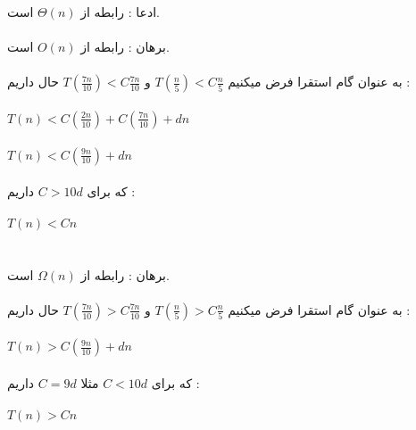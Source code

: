 
\subproblem{}
ادعا : رابطه از $\Theta(n)$ است.\\\\
برهان : رابطه از $O(n)$ است. \\\\
به عنوان گام استقرا فرض میکنیم $T(\frac{n}{5}) < C\frac{n}{5}$ و  $T(\frac{7n}{10}) < C\frac{7n}{10}$ حال داریم : \\\\
$T(n) < C (\frac{2n}{10}) + C (\frac{7n}{10})+ dn$\\\\
$T(n) < C (\frac{9n}{10})+ dn$\\\\
که برای $C>10d$ داریم :\\\\
$T(n) < Cn$\\\\\\

برهان : رابطه از $\Omega(n)$ است. \\\\
به عنوان گام استقرا فرض میکنیم $T(\frac{n}{5}) > C\frac{n}{5}$ و  $T(\frac{7n}{10}) > C\frac{7n}{10}$ حال داریم : \\\\
$T(n) > C (\frac{9n}{10})+ dn$\\\\
که برای $C<10d$ مثلا $C=9d$ داریم :\\\\
$T(n) > Cn$\\\\\\